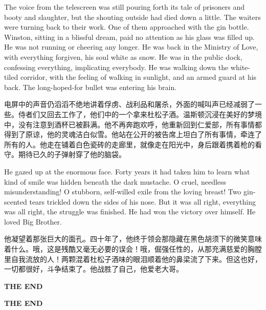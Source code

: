\begin{paracol}{2}
\switchcolumn*

The voice from the telescreen was still pouring forth its tale of
prisoners and booty and slaughter, but the shouting outside had died
down a little. The waiters were turning back to their work. One of them
approached with the gin bottle. Winston, sitting in a blissful dream,
paid no attention as his glass was filled up. He was not running or
cheering any longer. He was back in the Ministry of Love, with
everything forgiven, his soul white as snow. He was in the public dock,
confessing everything, implicating everybody. He was walking down the
white-tiled corridor, with the feeling of walking in sunlight, and an
armed guard at his back. The long-hoped-for bullet was entering his
brain.

\switchcolumn

电屏中的声音仍滔滔不绝地讲着俘虏、战利品和屠杀，外面的喊叫声已经减弱了一些。侍者们又回去工作了，他们中的一个拿来杜松子酒。温斯顿沉浸在美好的梦境中，没有注意到酒杯已被斟满。他不再奔跑欢呼，他重新回到仁爱部，所有事情都得到了原谅，他的灵魂洁白似雪。他站在公开的被告席上坦白了所有事情，牵连了所有的人。他走在铺着白色瓷砖的走廊里，就像走在阳光中，身后跟着携着枪的看守。期待已久的子弹射穿了他的脑袋。

\switchcolumn*

He gazed up at the enormous face. Forty years it had taken him to learn
what kind of smile was hidden beneath the dark mustache. O cruel,
needless misunderstanding! O stubborn, self-willed exile from the loving
breast! Two gin-scented tears trickled down the sides of his nose. But
it was all right, everything was all right, the struggle was finished.
He had won the victory over himself. He loved Big Brother.

\switchcolumn

他凝望着那张巨大的面孔。四十年了，他终于领会那隐藏在黑色胡须下的微笑意味着什么。哦，这是残酷又毫无必要的误会！哦，倔强任性的，从那充满慈爱的胸膛里自我流放的人！两颗混着杜松子酒味的眼泪顺着他的鼻梁流了下来。但这也好，一切都很好，斗争结束了。他战胜了自己，他爱老大哥。

\switchcolumn*

\begin{center}
\textbf{THE END}
\end{center}

\switchcolumn

\begin{center}
\textbf{THE END}
\end{center}

\switchcolumn*



\end{paracol}
